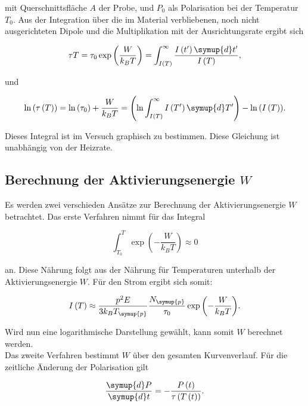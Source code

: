 mit Querschnittsfläche $A$ der Probe, und $P_0$ als Polarisation bei der Temperatur $T_0$. Aus der Integration über die im Material 
verbliebenen, noch nicht ausgerichteten Dipole und die Multiplikation mit der Ausrichtungsrate ergibt sich 

\begin{equation*}
    \tau{T} = \tau_0 \exp{\left(\frac{W}{k_B T}\right)} = \int_{I\left(T\right)}^{\infty} \frac{I\left(t'\right)\symup{d}t'}{I\left(T\right)},
\end{equation*}

und 

\begin{equation}
    \label{eqn:relax}
    \ln{\left(\tau\left(T\right)\right)} = \ln{\left(\tau_0\right)} + \frac{W}{k_B T} = \left(\ln{\int_{I\left(T\right)}^{\infty}I\left(T'\right)\symup{d}T'}\right)-\ln{\left(I\left(T\right)\right)}.
\end{equation}

Dieses Integral ist im Versuch graphisch zu bestimmen. Diese Gleichung ist unabhängig von der Heizrate.

\subsection{Berechnung der Aktivierungsenergie $W$}

Es werden zwei verschieden Ansätze zur Berechnung der Aktivierungsenergie $W$ betrachtet. Das erste Verfahren nimmt für das Integral

\begin{equation*}
    \int_{T_0}^T \exp{\left(-\frac{W}{k_B T}\right)} \approx 0
\end{equation*}

an. Diese Nährung folgt aus der Nährung für Temperaturen unterhalb der Aktivierungsenergie $W$. Für den Strom ergibt sich somit: 

\begin{equation*}
    I\left(T\right) \approx \frac{p^2 E}{3 k_B T_{\symup{p}}}\frac{N_{\symup{p}}}{\tau_0}\exp{\left(-\frac{W}{k_B T}\right)}.
\end{equation*}

Wird nun eine logarithmische Darstellung gewählt, kann somit $W$ berechnet werden. \\
Das zweite Verfahren bestimmt $W$ über den gesamten Kurvenverlauf. Für die zeitliche Änderung der Polarisation gilt

\begin{equation*}
    \frac{\symup{d}P}{\symup{d}t} = -\frac{P\left(t\right)}{\tau\left(T\left(t\right)\right)}.
\end{equation*}

